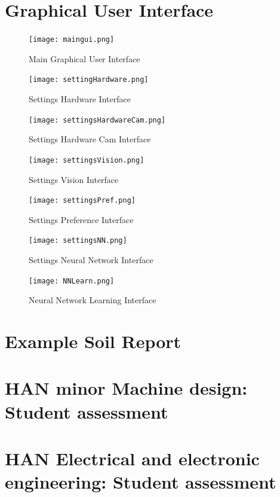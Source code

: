 \documentclass[11pt,fleqn,,a4paper,twoside,openright]{book}
\begin{document}
\chapter{Graphical User Interface}\label{app:GUI}
\begin{figure}[h]
	\texttt{[image: maingui.png]}
	\caption{Main Graphical User Interface}
\end{figure}
\begin{figure}[h]
	\texttt{[image: settingHardware.png]}
	\caption{Settings Hardware Interface}
\end{figure}
\begin{figure}[h]
	\texttt{[image: settingsHardwareCam.png]}
	\caption{Settings Hardware Cam Interface}
\end{figure}
\begin{figure}[h]
	\texttt{[image: settingsVision.png]}
	\caption{Settings Vision Interface}
\end{figure}
\begin{figure}[h]
	\texttt{[image: settingsPref.png]}
	\caption{Settings Preference Interface}
\end{figure}
\begin{figure}[h]
	\texttt{[image: settingsNN.png]}
	\caption{Settings Neural Network Interface}
\end{figure}
\begin{figure}[h]\label{fig:NNlearn}
	\texttt{[image: NNLearn.png]}
	\caption{Neural Network Learning Interface}
\end{figure}

\chapter{Example Soil Report}\label{app:examplereport}


\chapter{HAN minor Machine design: Student assessment}\label{app:HAN_assignment_Machine}


\chapter{HAN Electrical and electronic engineering: Student assessment}\label{app:HAN_assignement_Electrical}

\end{document}
